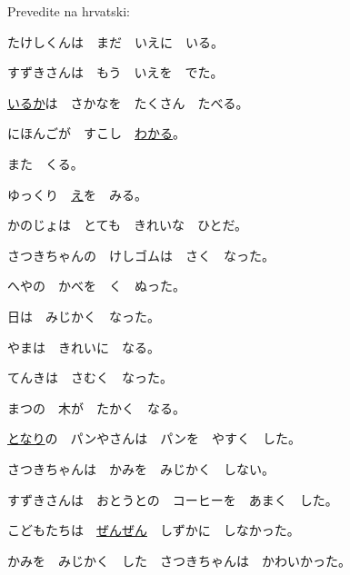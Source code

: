 	\begin{mondai}{Prevedite na hrvatski:}
		\item たけしくんは　まだ　いえに　いる。
		\item すずきさんは　もう　いえを　でた。
		\item \underline{いるか}は　さかなを　たくさん　たべる。
		\item にほんごが　すこし　\underline{わかる}。
		\item また　くる。
		\item ゆっくり　\underline{え}を　みる。
		\item かのじょは　とても　きれいな　ひとだ。
		\vspace{5pt}
		\item さつきちゃんの　けしゴムは　さく　なった。
		\item へやの　かべを　く　ぬった。
		\vspace{10pt}
		\item 日は　みじかく　なった。
		\item やまは　きれいに　なる。
		\item てんきは　さむく　なった。
		\item まつの　木が　たかく　なる。
		\item \underline{となり}の　パンやさん\footnotemark[2]は　パンを　やすく　した。
		\item さつきちゃんは　かみを　みじかく　しない。
		\item すずきさんは　おとうとの　コーヒーを　あまく　した。
		\item こどもたちは　\underline{ぜんぜん}　しずかに　しなかった。
		\item *かみを　みじかく　した　さつきちゃんは　かわいかった。
	\end{mondai}

